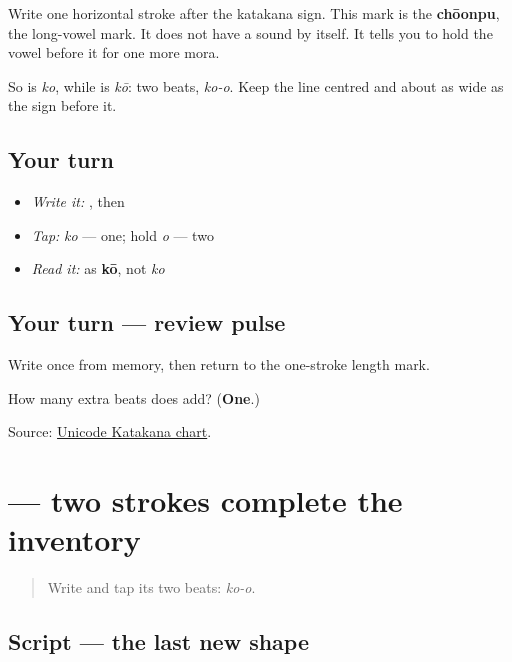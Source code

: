 \begin{quote}
\end{quote}

Write one horizontal stroke after the katakana sign. This mark is the \textbf{chōonpu}, the long-vowel mark. It does not have a sound by itself. It tells you to hold the vowel before it for one more mora.

So  is \emph{ko}, while  is \emph{kō}: two beats, \emph{ko-o}. Keep the line centred and about as wide as the sign before it.

\subsection*{Your turn}
\begin{itemize}
\raggedright
  \item \emph{Write it:} , then 
  \item \emph{Tap:} \emph{ko} — one; hold \emph{o} — two
  \item \emph{Read it:}  as \textbf{kō}, not \emph{ko}
\end{itemize}

\subsection*{Your turn — review pulse}
Write \textbf{} once from memory, then return to the one-stroke length mark.

\begin{tcolorbox}[breakable,colback=teal!4,colframe=teal!35!black,title={Before you move on}]
How many extra beats does  add? (\textbf{One}.)

Source: \href{https://www.unicode.org/charts/PDF/U30A0.pdf}{Unicode Katakana chart}.
\end{tcolorbox}
\section[\texorpdfstring{\ja{ヒ} (hi)}{ヒ (hi)}]{ — two strokes complete the inventory}

\label{lesson:JA-W06-hi-katakana}



\begin{quote}
Write  and tap its two beats: \emph{ko-o}.
\end{quote}

\subsection*{Script — the last new shape}


